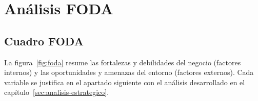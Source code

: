 \capredactadotrue
\section{Análisis FODA}

\subsection{Cuadro FODA}
La figura~\ref{fig:foda} resume las fortalezas y debilidades del negocio (factores internos) y las oportunidades y amenazas del entorno (factores externos). Cada variable se justifica en el apartado siguiente con el análisis desarrollado en el capítulo~\ref{sec:analisis-estrategico}.


